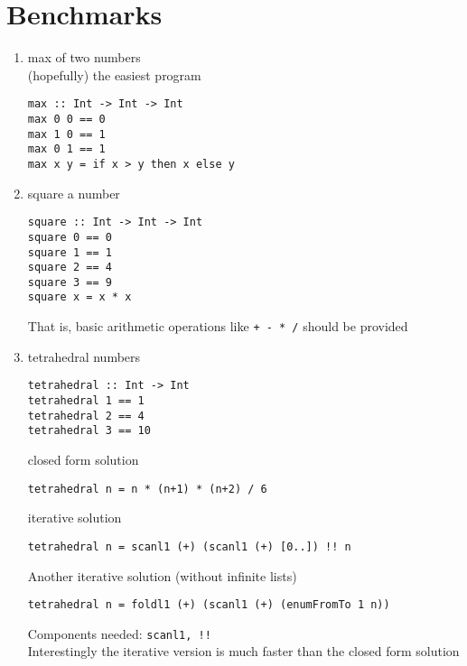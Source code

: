 \chapter{Benchmarks} \label{benchmarks}


\begin{enumerate}
	\item max of two numbers\\
	(hopefully) the easiest program \\
	\begin{lstlisting}
max :: Int -> Int -> Int
max 0 0 == 0
max 1 0 == 1
max 0 1 == 1
max x y = if x > y then x else y
	\end{lstlisting}
	\item square a number
	\begin{lstlisting}
square :: Int -> Int -> Int
square 0 == 0
square 1 == 1
square 2 == 4
square 3 == 9
square x = x * x
	\end{lstlisting}
	That is, basic arithmetic operations like \lstinline!+ - * /! should be provided
	\item tetrahedral numbers \\
	\begin{lstlisting}
tetrahedral :: Int -> Int
tetrahedral 1 == 1
tetrahedral 2 == 4
tetrahedral 3 == 10
	\end{lstlisting}
	closed form solution
	\begin{lstlisting}
tetrahedral n = n * (n+1) * (n+2) / 6
	\end{lstlisting}
	iterative solution
	\begin{lstlisting}
tetrahedral n = scanl1 (+) (scanl1 (+) [0..]) !! n
	\end{lstlisting}
	Another iterative solution (without infinite lists)
	\begin{lstlisting}
tetrahedral n = foldl1 (+) (scanl1 (+) (enumFromTo 1 n))
	\end{lstlisting}
	Components needed: \lstinline?scanl1, !!? \\
	Interestingly the iterative version is much faster than the closed form solution

\end{enumerate}
